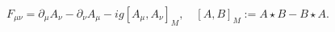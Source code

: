 \begin{equation}
F_{\mu\nu} = \partial_\mu A_\nu -\partial_\nu A_\mu -ig[A_\mu,A_\nu]_M, 
\quad [A,B]_M := A\star B - B\star A .
\end{equation}

